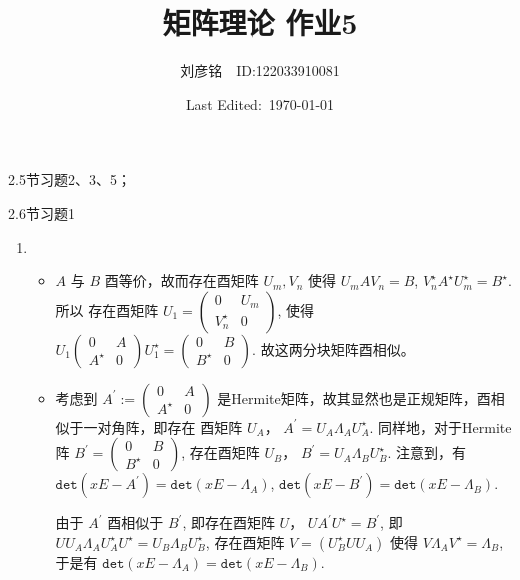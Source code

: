 \documentclass{article}
\title{矩阵理论 作业5}
\author{刘彦铭\ \ ID:122033910081}
\date{Last Edited:\ \today}
\begin{document}
\maketitle

2.5节习题2、3、5；

2.6节习题1

\begin{spacing}{1.5}
    \begin{enumerate}
        \item [2.5 习题2]
        
        \begin{itemize}
            \item [$\Rightarrow$:]
            
            $A$ 与 $B$ 酉等价，故而存在酉矩阵 $U_m, V_n$ 使得 $U_m A V_n = B$, $V_n^\star A^\star U_m^\star = B^\star$. 所以 存在酉矩阵 
            $U_1 = \left(\begin{array}{cc}0&U_m\\V_n^\star&0\end{array}\right)$, 使得 
            $U_1 \left(\begin{array}{cc}0&A\\A^\star&0\end{array}\right) U_1^\star = \left(\begin{array}{cc}0&B\\B^\star&0\end{array}\right)$.
            故这两分块矩阵酉相似。

            \item [$\Leftarrow$:]
            
            考虑到 $A^\prime := \left(\begin{array}{cc}0&A\\A^\star&0\end{array}\right)$ 是Hermite矩阵，故其显然也是正规矩阵，酉相似于一对角阵，即存在 酉矩阵 $U_A$，
            $A^\prime = U_A \Lambda_A U_A^\star$. 同样地，对于Hermite阵 $B^\prime = \left(\begin{array}{cc}0&B\\B^\star&0\end{array}\right)$, 存在酉矩阵 $U_B$，
            $B^\prime = U_A \Lambda_B U_B^\star$. 注意到，有 $\mathtt{det}(xE - A^\prime) = \mathtt{det}(xE - \Lambda_A)$, $\mathtt{det}(xE - B^\prime) = \mathtt{det}(xE - \Lambda_B)$.
            
            由于 $A^\prime$ 酉相似于 $B^\prime$, 即存在酉矩阵 $U$， $UA^\prime U^\star = B^\prime$, 即 $UU_A\Lambda_AU_A^\star U^\star = U_B\Lambda_BU_B^\star$, 存在酉矩阵 
            $V = (U_B^\star UU_A)$ 使得 $V\Lambda_A V^\star = \Lambda_B$, 于是有 $\mathtt{det}(xE - \Lambda_A) = \mathtt{det}(xE - \Lambda_B)$.
            

\end{itemize}
\end{enumerate}
\end{spacing}
\end{document}
